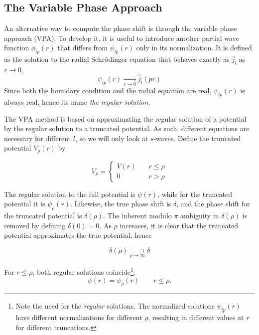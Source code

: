 \subsection{The Variable Phase Approach}
An alternative way to compute the phase shift is through the variable phase
approach (VPA).
To develop it, it is useful to introduce another partial wave function
\(\phi_{lp}(r)\) that differs from \(\psi_{lp}(r)\) only in its normalization.
It is defined as the solution to the radial Schr\"odinger equation that behaves
exactly as \(\hat{j}_{l}\) as \(r\to 0\),
\begin{equation*}
  \psi_{lp}(r) \xrightarrow[r\to 0]{} \hat{j}_{l}(pr)
\end{equation*}
Since both the boundary condition and the radial equation are real,
\(\psi_{lp}(r)\) is always real, hence its name \textit{the regular solution}.

The VPA method is based on approximating the regular solution of a potential by
the regular solution to a truncated potential. As such, different equations are
necessary for different \(l\), so we will only look at \(s\)-waves. Define the
truncated potential \(V_{\rho}(r)\) by

\begin{equation*}
  V_{\rho} =
  \begin{cases}
    V(r) &\quad r \le \rho\\
    0 &\quad r > \rho
  \end{cases}
\end{equation*}

The regular solution to the full potential is \(\psi(r)\), while for the
truncated potential it is \(\psi_{\rho}(r)\). Likewise, the true phase shift is
\(\delta\), and the phase shift for the truncated potential is \(\delta(\rho)\).
The inherent modulo \(\pi\) ambiguity in \(\delta(\rho)\) is removed by defining
\(\delta(0)=0\). As \(\rho\) increases, it is clear that the truncated potential
approximates the true potential, hence

\[\delta(\rho)\xrightarrow[\rho\to\infty]{}\delta\]

For \(r\le \rho\), both regular solutions coincide\footnote{Note the need for
  the \textit{regular} solutions. The normalized solutions \(\psi_{lp}(r)\) have
  different normalizations for different \(\rho\), resulting in different values at \(r\) for different truncations.}:
\begin{equation*}
  \psi(r) = \psi_{\rho}(r) \qquad r \le \rho.
\end{equation*}

